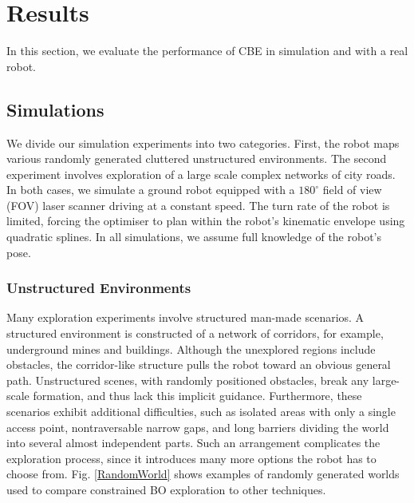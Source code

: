\documentclass[shortAfour,sageh,times]{sagej_no_sage}
\begin{document}
\section{Results}
\label{sec:experimental}
In this section, we evaluate the performance of CBE in simulation and with a real robot. 

\subsection{Simulations}
We divide our simulation experiments into two categories. First, the robot maps various randomly generated cluttered unstructured environments. The second experiment involves exploration of a large scale complex networks of city roads. In both cases, we simulate a ground robot equipped with a $180^\circ$ field of view (FOV) laser scanner driving at a constant speed. The turn rate of the robot is limited, forcing the optimiser to plan within the robot's kinematic envelope using quadratic splines. In all simulations, we assume full knowledge of the robot's pose.

\subsubsection{Unstructured Environments} 	\hfill \break
Many exploration experiments involve structured man-made scenarios. A structured environment is constructed of a network of corridors, for example, underground mines and buildings. Although the unexplored regions include obstacles, the corridor-like structure pulls the robot toward an obvious general path. Unstructured scenes, with randomly positioned obstacles, break any large-scale formation, and thus lack this implicit guidance. Furthermore, these scenarios exhibit additional difficulties, such as isolated areas with only a single access point, nontraversable narrow gaps, and long barriers dividing the world into several almost independent parts. Such an arrangement complicates the exploration process, since it introduces many more options the robot has to choose from. Fig. \ref{RandomWorld} shows examples of randomly generated worlds used to compare constrained BO exploration to other techniques. 
\end{document}

